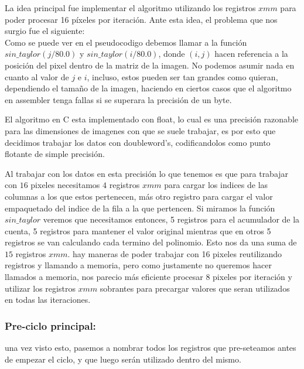 La idea principal fue implementar el algoritmo utilizando los registros $xmm$ para poder procesar 16 píxeles por iteración. Ante esta idea, el problema que nos surgio fue el siguiente:\\

Como se puede ver en el pseudocodigo debemos llamar a la función $sin\_taylor(j/80.0)$ y $sin\_taylor(i/80.0)$, donde $(i,j)$ hacen referencia a la posición del pixel dentro de la matriz de la imagen. No podemos asumir nada en cuanto al valor de $j$ e $i$, incluso, estos pueden ser tan grandes como quieran, dependiendo el tamaño de la imagen, haciendo en ciertos casos que el algoritmo en assembler tenga fallas si se superara la precisión de un byte. 

El algoritmo en C esta implementado con float, lo cual es una precisión razonable para las dimensiones de imagenes con que se suele trabajar, es por esto que decidimos trabajar los datos con doubleword's, codificandolos como punto flotante de simple precisión.

Al trabajar con los datos en esta precisión lo que tenemos es que para trabajar con $16$ pixeles necesitamos $4$ registros $xmm$ para cargar los indices de las columnas a los que estos pertenecen, más otro registro para cargar el valor empaquetado del indice de la fila a la que pertencen. Si miramos la función $sin\_taylor$ veremos que necesitamos entonces, 5 registros para el acumulador de la cuenta, 5 registros para mantener el valor original mientras que en otros 5 registros se van calculando cada termino del polinomio. Esto nos da una suma de $15$ registros $xmm$. hay maneras de poder trabajar con 16 pixeles reutilizando registros y llamando a memoria, pero como justamente no queremos hacer llamados a memoria, nos parecio más eficiente procesar 8 pixeles por iteración y utilizar los registros $xmm$ sobrantes para precargar valores que seran utilizados en todas las iteraciones. \\

\subsubsection{Pre-ciclo principal:}
una vez visto esto, pasemos a nombrar todos los registros que pre-seteamos antes de empezar el ciclo, y que luego serán utilizado dentro del mismo.

